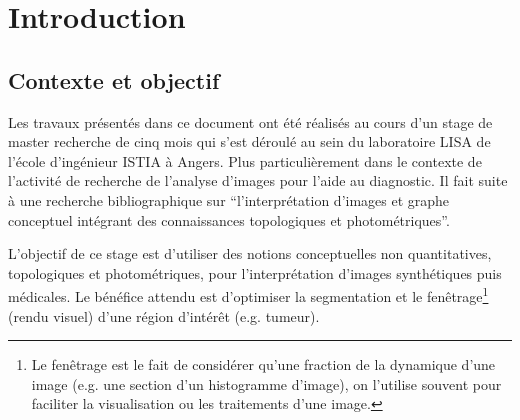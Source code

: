 
\chapter{Introduction}                   		%
	\section{Contexte et objectif}

	Les travaux présentés dans ce document ont été réalisés au cours d'un stage de master recherche de cinq mois qui s'est déroulé au sein du laboratoire LISA de l'école d'ingénieur ISTIA à Angers. Plus particulièrement dans le contexte de l'activité de recherche de l'analyse d'images pour l'aide au diagnostic. Il fait suite à une recherche bibliographique sur ``l'interprétation d'images et graphe conceptuel intégrant des connaissances topologiques et photométriques''. 
	
	L'objectif de ce stage est d'utiliser des notions conceptuelles non quantitatives, topologiques et photométriques, pour l'interprétation d'images synthétiques puis médicales.
	Le bénéfice attendu est d'optimiser la segmentation et le fenêtrage\footnote{Le fenêtrage est le fait de considérer qu'une fraction de la dynamique d'une image (e.g. une section d'un histogramme d'image), on l'utilise souvent pour faciliter la visualisation ou les traitements d'une image.} (rendu visuel) d'une région d'intérêt (e.g. tumeur).
	

